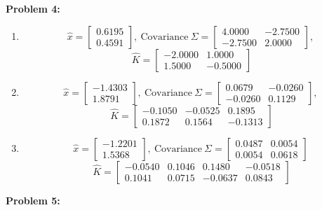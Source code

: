 \documentclass[letterpaper]{article}
\begin{document}
\noindent \textbf{Problem 4:}
\begin{enumerate}
\setlength{\itemsep}{.1in}
\renewcommand{\labelenumi}{(\alph{enumi})}
\item
$$ \hat{x}=\left[\begin{array}{r} 0.6195 \\0.4591\end{array} \right],~\text{Covariance}~ \Sigma=\left[\begin{array}{rr} 4.0000 & -2.7500\\ -2.7500 & 2.0000\end{array} \right],$$
$$~\hat{K}=\left[\begin{array}{rr}-2.0000& 1.0000\\1.5000& -0.5000\end{array}\right]$$

\item
$$ \hat{x}=\left[\begin{array}{r} -1.4303 \\1.8791\end{array} \right],~\text{Covariance}~ \Sigma=\left[\begin{array}{rr} 0.0679 & -0.0260\\ -0.0260 & 0.1129\end{array} \right],$$
$$~\hat{K}=\left[\begin{array}{rrr} -0.1050 & -0.0525 & 0.1895 \\ 0.1872 & 0.1564 & -0.1313 \end{array} \right]$$
\item
$$ \hat{x}=\left[\begin{array}{r} -1.2201 \\1.5368\end{array} \right],~\text{Covariance}~ \Sigma=\left[\begin{array}{rr} 0.0487 & 0.0054\\ 0.0054 & 0.0618\end{array} \right]$$
$$~\hat{K}=\left[\begin{array}{rrrr} -0.0540 & 0.1046 & 0.1480 & -0.0518 \\ 0.1041 & 0.0715 & -0.0637 & 0.0843\end{array} \right]$$

\end{enumerate}
\bigskip
\newpage
\noindent \textbf{Problem 5:}
\end{document}
